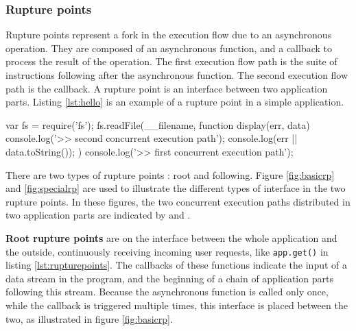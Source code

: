 \subsubsection{Rupture points}

Rupture points represent a fork in the execution flow due to an asynchronous operation.
They are composed of an asynchronous function, and a callback to process the result of the operation.
The first execution flow path is the suite of instructions following after the asynchronous function.
The second execution flow path is the callback.
A rupture point is an interface between two application parts.
Listing \ref{lst:hello} is an example of a rupture point in a simple application.

\begin{code}[Javascript, caption={Example of a rupture point : an asynchronous function call, \texttt{fs.readFile()}, with a callback parameter, \texttt{function display}},label={lst:hello}]
var fs = require('fs');
fs.readFile(__filename, function display(err, data) {
  console.log('>> second concurrent execution path');
  console.log(err || data.toString());
})
console.log('>> first concurrent execution path');
\end{code}


There are two types of rupture points : root and following.
Figure \ref{fig:basicrp} and \ref{fig:specialrp} are used to illustrate the different types of interface in the two rupture points.
In these figures, the two concurrent execution paths distributed in two application parts are indicated by  and .

\textbf{Root rupture points} are on the interface between the whole application and the outside, continuously receiving incoming user requests, like \texttt{app.get()} in listing \ref{lst:rupturepoints}.
The callbacks of these functions indicate the input of a data stream in the program, and the beginning of a chain of application parts following this stream.
Because the asynchronous function is called only once, while the callback is triggered multiple times, this interface is placed between the two, as illustrated in figure \ref{fig:basicrp}.

